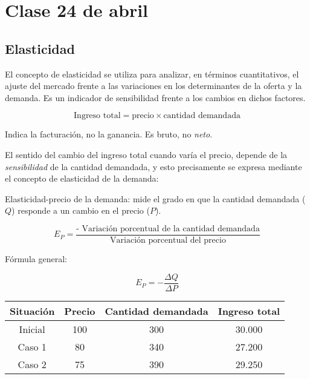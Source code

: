 \section{Clase 24 de abril}

\subsection{Elasticidad}

El concepto de elasticidad se utiliza para analizar,
en términos cuantitativos,
el ajuste del mercado frente a las variaciones en los determinantes de la oferta y la demanda.
Es un indicador de sensibilidad frente a los cambios en dichos factores.

\begin{equation*}
    \text{Ingreso total} = \text{precio} \times \text{cantidad demandada}
\end{equation*}

Indica la facturación, no la ganancia.
Es bruto, no \textit{neto}.

El sentido del cambio del ingreso total cuando varía el precio,
depende de la \textit{sensibilidad} de la cantidad demandada,
y esto precisamente se expresa mediante el concepto de elasticidad de la demanda:

Elasticidad-precio de la demanda:
mide el grado en que la cantidad demandada (\(Q\)) responde a un cambio en el precio (\(P\)).

\begin{equation*}
    E_P = \frac{\text{- Variación porcentual de la cantidad demandada}}{\text{Variación porcentual del precio}}
\end{equation*}

Fórmula general:

\begin{equation*}
    E_P = - \frac{\Delta Q}{\Delta P}
\end{equation*}

\begin{table}[H]
    \centering
    \begin{tabular}{cccc}
        \hline
        Situación & Precio & Cantidad demandada & Ingreso total \\
        \hline
        Inicial   & 100    & 300                & 30.000        \\
        Caso 1    & 80     & 340                & 27.200        \\
        Caso 2    & 75     & 390                & 29.250        \\
        \hline
    \end{tabular}
\end{table}

